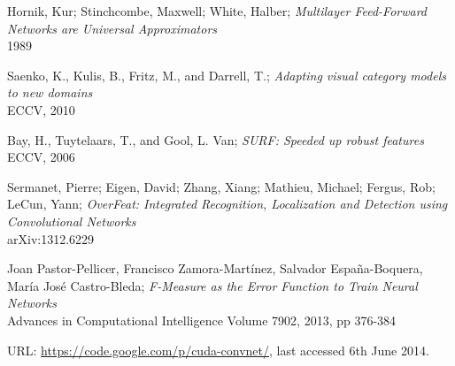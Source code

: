 \documentclass[a4paper,11pt]{article}
\begin{document}
\begin{thebibliography}{1}
 Hornik, Kur; Stinchcombe, Maxwell; White, Halber;
 \emph{Multilayer Feed-Forward Networks are Universal Approximators}\\
 1989

 Saenko, K., Kulis, B., Fritz, M., and Darrell, T.;
 \emph{Adapting visual category models to new domains}\\
 ECCV, 2010

 Bay, H., Tuytelaars, T., and Gool, L. Van;
 \emph{SURF: Speeded up robust features}\\
 ECCV, 2006

 Sermanet, Pierre; Eigen, David; Zhang, Xiang; Mathieu, Michael; Fergus, Rob; LeCun, Yann;
 \emph{OverFeat: Integrated Recognition, Localization and Detection using Convolutional Networks}\\
 arXiv:1312.6229
  
 Joan Pastor-Pellicer, Francisco Zamora-Martínez, Salvador España-Boquera, María José Castro-Bleda;
 \emph{F-Measure as the Error Function to Train Neural Networks}\\
 Advances in Computational Intelligence
 Volume 7902, 2013, pp 376-384
 
 URL: \url{https://code.google.com/p/cuda-convnet/}, last accessed 6th June 2014.

\end{thebibliography}
\end{document}
